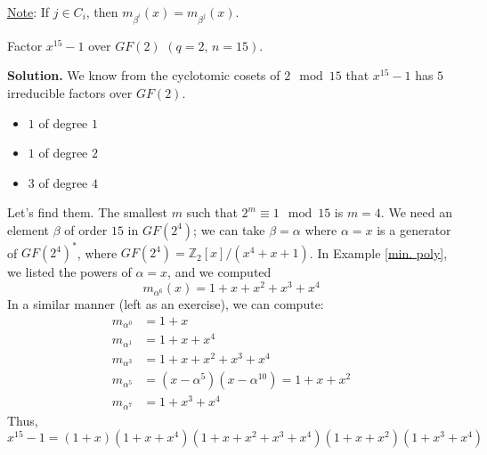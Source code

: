 \underline{Note}: If $ j\in C_i $, then $ m_{\beta^i}(x)=m_{\beta^j}(x) $.

\begin{exbox}
    \begin{example}
        Factor $ x^{15}-1 $ over $ GF(2) $ $ (q=2,\,n=15) $.

        \textbf{Solution.} We know from the cyclotomic cosets
        of $ 2\mod 15 $ that $ x^{15}-1 $ has $ 5 $ irreducible
        factors over $ GF(2) $.
        \begin{itemize}
            \item $ 1 $ of degree $ 1 $
            \item $ 1 $ of degree $ 2 $
            \item $ 3 $ of degree $ 4 $
        \end{itemize}
        Let's find them. The smallest $ m $ such that
        $ 2^m\equiv 1\mod 15 $ is $ m=4 $. We need an element
        $ \beta $ of order $ 15 $ in $ GF(2^4) $; we can
        take $ \beta=\alpha $ where $ \alpha=x $
        is a generator of $ GF(2^4)^* $, where
        $ GF(2^4)=\mathbb{Z}_2[x]/(x^4+x+1) $. In Example
        \ref{min. poly}, we listed
        the powers of $ \alpha=x $, and we computed
        \[ m_{\alpha^6}(x)=1+x+x^2+x^3+x^4 \]
        In a similar manner (left as an exercise), we can compute:
        \begin{align*}
            m_{\alpha^0} & =1+x                                 \\
            m_{\alpha^1} & =1+x+x^4                             \\
            m_{\alpha^3} & =1+x+x^2+x^3+x^4                     \\
            m_{\alpha^5} & =(x-\alpha^5)(x-\alpha^{10})=1+x+x^2 \\
            m_{\alpha^7} & =1+x^3+x^4
        \end{align*}
        Thus,
        \[ x^{15}-1=(1+x)(1+x+x^4)(1+x+x^2+x^3+x^4)(1+x+x^2)(1+x^3+x^4) \]
    \end{example}
\end{exbox}

